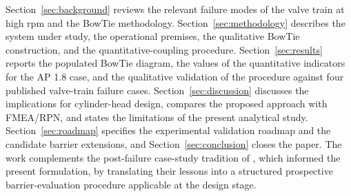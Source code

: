 Section~\ref{sec:background} reviews the relevant failure modes of the
valve train at high rpm and the BowTie methodology.
Section~\ref{sec:methodology} describes the system under study, the
operational premises, the qualitative BowTie construction, and the
quantitative-coupling procedure. Section~\ref{sec:results} reports the
populated BowTie diagram, the values of the quantitative indicators
for the AP 1.8 case, and the qualitative validation of the procedure
against four published valve-train failure cases.
Section~\ref{sec:discussion} discusses the implications for
cylinder-head design, compares the proposed approach with FMEA/RPN,
and states the limitations of the present analytical study.
Section~\ref{sec:roadmap} specifies the experimental validation
roadmap and the candidate barrier extensions, and
Section~\ref{sec:conclusion} closes the paper. The work complements the
post-failure case-study tradition of
\citet{velezgodino2019overheadvalvetrain,soffritti2018wornvalvetrain,xing2021valvespringEAC,zhao2023camshaftV6},
which informed the present formulation, by translating their lessons
into a structured prospective barrier-evaluation procedure applicable
at the design stage.
